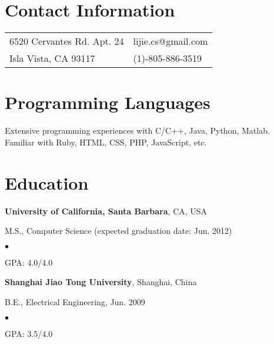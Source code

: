 \documentclass[margin,line]{res}
\newenvironment{list1}{
  \begin{list}{\ding{113}}{%
      \setlength{\itemsep}{0in}
      \setlength{\parsep}{0in} \setlength{\parskip}{0in}
      \setlength{\topsep}{0in} \setlength{\partopsep}{0in}
      \setlength{\leftmargin}{0.17in}}}{\end{list}}
\newenvironment{list2}{
  \begin{list}{$\bullet$}{%
      \setlength{\itemsep}{0in}
      \setlength{\parsep}{0in} \setlength{\parskip}{0in}
      \setlength{\topsep}{0in} \setlength{\partopsep}{0in}
      \setlength{\leftmargin}{0.2in}}}{\end{list}}
\begin{document}

\begin{resume}
\section{\sc Contact Information}
\vspace{.05in}
\begin{tabular}{@{}p{2in}p{4in}}
6520 Cervantes Rd. Apt. 24       & lijie.cs@gmail.com \\
Isla Vista, CA 93117             & (1)-805-886-3519 \\
\end{tabular}


\section{\sc Programming Languages}
Extensive programming experiences with C/C++, Java, Python, Matlab. \\
Familiar with Ruby, HTML, CSS, PHP, JavaScript, etc.


\section{\sc Education}
{\bf University of California, Santa Barbara}, CA, USA\\
\vspace*{-.1in}
\begin{list1}
\item[] M.S., Computer Science (expected
  graduation date: Jun. 2012)
\begin{list2}
\vspace*{.05in}
\item GPA:  4.0/4.0
\end{list2}
\end{list1}

{\bf Shanghai Jiao Tong University}, Shanghai, China\\
\vspace*{-.1in}
\begin{list1}
\item[] B.E., Electrical Engineering,  Jun. 2009
\begin{list2}
\vspace*{.05in}
\item GPA:  3.5/4.0
\end{list2}
\end{list1}



\end{resume}
\end{document}

